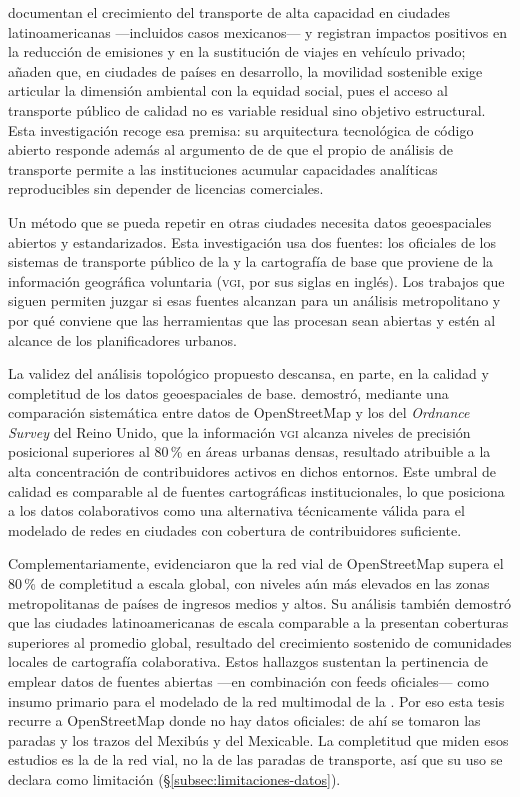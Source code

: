 \citet{hidalgo2013brt} documentan el crecimiento del transporte de alta
capacidad en ciudades latinoamericanas ---incluidos casos mexicanos--- y
registran impactos positivos en la reducción de emisiones y en la sustitución de
viajes en vehículo privado; \citet{pojani2015sustainable} añaden que, en
ciudades de países en desarrollo, la movilidad sostenible exige articular la
dimensión ambiental con la equidad social, pues el acceso al transporte público
de calidad no es variable residual sino objetivo estructural. Esta investigación
recoge esa premisa: su arquitectura tecnológica de código abierto responde
además al argumento de \citet{moreno2023} de que el  propio de análisis
de transporte permite a las instituciones acumular capacidades analíticas
reproducibles sin depender de licencias comerciales.

Un método que se pueda repetir en otras ciudades necesita datos geoespaciales
abiertos y estandarizados. Esta investigación usa dos fuentes: los
 \gtfs{} oficiales de los sistemas de transporte público de la
\zmvm{} y la cartografía de base que proviene de la información geográfica
voluntaria (\textsc{vgi}, por sus siglas en inglés). Los trabajos que siguen
permiten juzgar si esas fuentes alcanzan para un análisis metropolitano y por
qué conviene que las herramientas que las procesan sean abiertas y estén al
alcance de los planificadores urbanos.

La validez del análisis topológico propuesto descansa, en parte, en la calidad y
completitud de los datos geoespaciales de base. \citet{haklay2010good} demostró,
mediante una comparación sistemática entre datos de OpenStreetMap y los del
\textit{Ordnance Survey} del Reino Unido, que la información \textsc{vgi}
alcanza niveles de precisión posicional superiores al 80\,\% en áreas urbanas
densas, resultado atribuible a la alta concentración de contribuidores activos
en dichos entornos. Este umbral de calidad es comparable al de fuentes
cartográficas institucionales, lo que posiciona a los datos colaborativos como
una alternativa técnicamente válida para el modelado de redes en ciudades con
cobertura de contribuidores suficiente.

Complementariamente, \citet{barrington2017world} evidenciaron que la red vial de
OpenStreetMap supera el 80\,\% de completitud a escala global, con niveles aún más
elevados en las zonas metropolitanas de países de ingresos medios y altos. Su
análisis también demostró que las ciudades latinoamericanas de escala comparable
a la \zmvm{} presentan coberturas superiores al promedio global, resultado del
crecimiento sostenido de comunidades locales de cartografía colaborativa. Estos
hallazgos sustentan la pertinencia de emplear datos \gis{} de fuentes abiertas
---en combinación con feeds \gtfs{} oficiales--- como insumo primario para el
modelado de la red multimodal de la \zmvm{}. Por eso esta tesis recurre a
OpenStreetMap donde no hay datos oficiales: de ahí se tomaron las paradas y los
trazos del Mexibús y del Mexicable. La completitud que miden esos estudios es la
de la red vial, no la de las paradas de transporte, así que su uso se declara
como limitación (§\ref{subsec:limitaciones-datos}).

